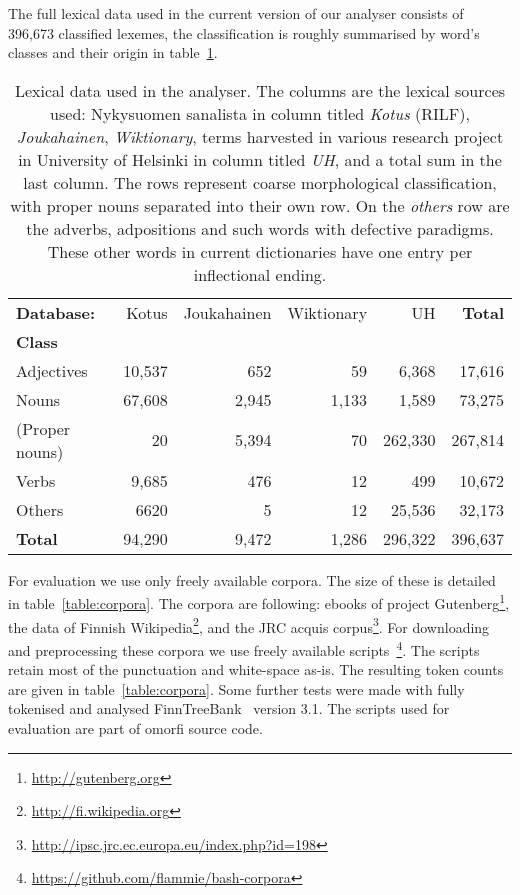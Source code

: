 \documentclass[a4paper,12pt]{article}
\begin{document}
The full lexical data used in the current version of our analyser consists of
396,673 classified lexemes, the classification is roughly summarised by word's
classes and their origin in table~\ref{table:lexical}. 

\begin{table}
    \begin{scriptsize}
  \centering
    \begin{tabular}{|l|r|r|r|r||r|}
        \hline
        \bf Database: & Kotus & Joukahainen & Wiktionary & UH & \bf Total \\
        \bf Class   & & & & & \\
        \hline
        Adjectives     & 10,537 & 652   & 59    & 6,368   & 17,616  \\
        Nouns          & 67,608 & 2,945 & 1,133 & 1,589   & 73,275  \\
        (Proper nouns) & 20     & 5,394 & 70    & 262,330 & 267,814 \\
        Verbs          & 9,685  & 476   & 12    & 499     & 10,672  \\
        Others         & 6620   & 5     & 12    & 25,536  & 32,173  \\
        \hline
        \bf Total      & 94,290 & 9,472 & 1,286 & 296,322 & 396,637 \\
        \hline
    \end{tabular}
  \caption{Lexical data used in the analyser.  The columns are the lexical
      sources used: Nykysuomen sanalista in column titled \emph{Kotus} (RILF),
      \emph{Joukahainen}, \emph{Wiktionary}, terms harvested in various
      research project in University of Helsinki in column titled \emph{UH},
      and a total sum in the last column. The rows represent coarse
      morphological classification, with proper nouns separated into their own
      row. On the \emph{others} row are the adverbs, adpositions and such words
      with defective paradigms. These other words in current dictionaries have
      one entry per inflectional ending.
  \label{table:lexical}}
  \end{scriptsize}
\end{table}


For evaluation we use only freely available corpora. The size of these is
detailed in table~\ref{table:corpora}. The corpora are following: ebooks of
project Gutenberg\footnote{\url{http://gutenberg.org}}, the data of Finnish
Wikipedia\footnote{\url{http://fi.wikipedia.org}}, and the JRC acquis
corpus\footnote{\url{http://ipsc.jrc.ec.europa.eu/index.php?id=198}}. For
downloading and preprocessing these corpora we use freely available
scripts~\footnote{\url{https://github.com/flammie/bash-corpora}}. The scripts
retain most of the punctuation and white-space as-is. The resulting token
counts are given in table~\ref{table:corpora}. Some further tests were made
with fully tokenised and analysed
FinnTreeBank~\citep{voutilainen2012specifying} version 3.1.  The scripts used
for evaluation are part of omorfi source code.
\end{document}
